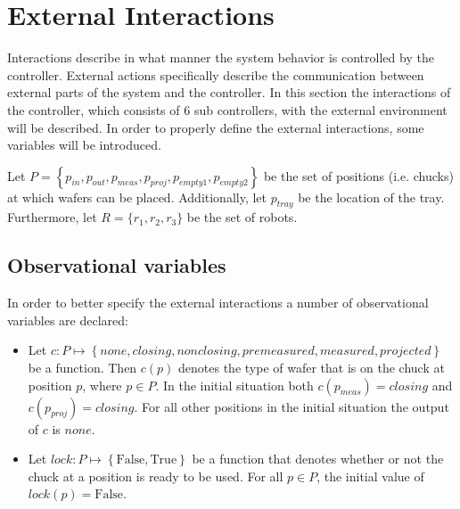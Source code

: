 \section{External Interactions}
Interactions describe in what manner the system behavior is controlled by the controller.
External actions specifically describe the communication between external parts of the system and the controller.
In this section the interactions of the controller, which consists of $6$ sub controllers, with the external environment will be described.
In order to properly define the external interactions, some variables will be introduced.

Let $P = \left\{p_\mathit{in}, p_\mathit{out}, p_\mathit{meas}, p_\mathit{proj}, p_\mathit{empty1}, p_\mathit{empty2}\right\}$ be the set of positions (i.e. chucks) at which wafers can be placed.
Additionally, let $\mathit{p_\mathit{tray}}$ be the location of the tray.
Furthermore, let $R = \{r_1,r_2,r_3\}$ be the set of robots.

\subsection{Observational variables}
In order to better specify the external interactions a number of observational variables are declared:
\begin{itemize}
    \item Let $c : P \mapsto \left\{\mathit{none}, \mathit{closing}, \mathit{nonclosing}, \mathit{premeasured}, \mathit{measured}, \mathit{projected}\right\}$ be a function.
        Then $c(p)$ denotes the type of wafer that is on the chuck at position $p$, where $p \in P$.
        In the initial situation both $c\left(p_\mathit{meas}\right) = \mathit{closing}$ and $c\left(p_\mathit{proj}\right) = \mathit{closing}$.
        For all other positions in the initial situation the output of $c$ is $\mathit{none}$.
    \item Let $\mathit{lock} : P \mapsto \left\{\text{False}, \text{True}\right\}$ be a function that denotes whether or not the chuck at a position is ready to be used.
        For all $p \in P$, the initial value of $\mathit{lock}(p) = \text{False}$.
\end{itemize}


